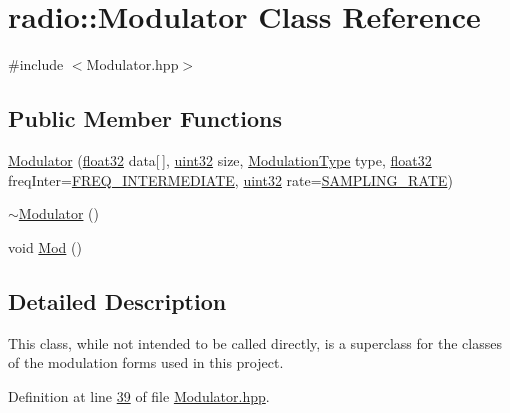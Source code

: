 \hypertarget{classradio_1_1Modulator}{\section{radio\+:\+:Modulator Class Reference}
\label{classradio_1_1Modulator}
}


{\ttfamily \#include $<$Modulator.\+hpp$>$}

\subsection*{Public Member Functions}
\begin{DoxyCompactItemize}
\item 
\hyperlink{classradio_1_1Modulator_ab202651b368986cc76673b6e997550b8}{Modulator} (\hyperlink{definitions_8hpp_aacdc525d6f7bddb3ae95d5c311bd06a1}{float32} data\mbox{[}$\,$\mbox{]}, \hyperlink{definitions_8hpp_a1134b580f8da4de94ca6b1de4d37975e}{uint32} size, \hyperlink{namespaceradio_a46fb7299001138f28b7f69975c58399e}{Modulation\+Type} type, \hyperlink{definitions_8hpp_aacdc525d6f7bddb3ae95d5c311bd06a1}{float32} freq\+Inter=\hyperlink{namespaceradio_aa82ddc6ba206798fd70ffc25665b3cb6}{F\+R\+E\+Q\+\_\+\+I\+N\+T\+E\+R\+M\+E\+D\+I\+A\+T\+E}, \hyperlink{definitions_8hpp_a1134b580f8da4de94ca6b1de4d37975e}{uint32} rate=\hyperlink{namespaceradio_a284213fea4beed2f74bb936927cbe654}{S\+A\+M\+P\+L\+I\+N\+G\+\_\+\+R\+A\+T\+E})
\item 
\hyperlink{classradio_1_1Modulator_a712e6e110c57b29ebdd754bd34bf269b}{$\sim$\+Modulator} ()
\item 
void \hyperlink{classradio_1_1Modulator_ab5eac6e4900579486b5871b48e64cdab}{Mod} ()
\end{DoxyCompactItemize}


\subsection{Detailed Description}
This class, while not intended to be called directly, is a superclass for the classes of the modulation forms used in this project. 

Definition at line \hyperlink{Modulator_8hpp_source_l00039}{39} of file \hyperlink{Modulator_8hpp_source}{Modulator.\+hpp}.



